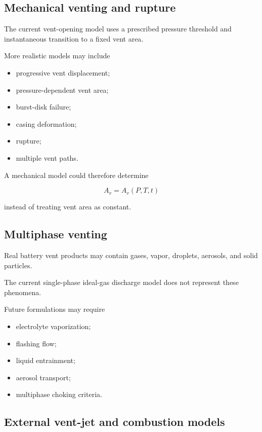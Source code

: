\subsection{Mechanical venting and rupture}

The current vent-opening model uses a prescribed pressure threshold and
instantaneous transition to a fixed vent area.

More realistic models may include

\begin{itemize}
    \item progressive vent displacement;
    \item pressure-dependent vent area;
    \item burst-disk failure;
    \item casing deformation;
    \item rupture;
    \item multiple vent paths.
\end{itemize}

A mechanical model could therefore determine

\begin{equation}
    A_v
    =
    A_v
    \left(
        P,
        T,
        t
    \right)
\end{equation}

instead of treating vent area as constant.


\subsection{Multiphase venting}

Real battery vent products may contain gases, vapor, droplets, aerosols,
and solid particles.

The current single-phase ideal-gas discharge model does not represent
these phenomena.

Future formulations may require

\begin{itemize}
    \item electrolyte vaporization;
    \item flashing flow;
    \item liquid entrainment;
    \item aerosol transport;
    \item multiphase choking criteria.
\end{itemize}


\subsection{External vent-jet and combustion models}

